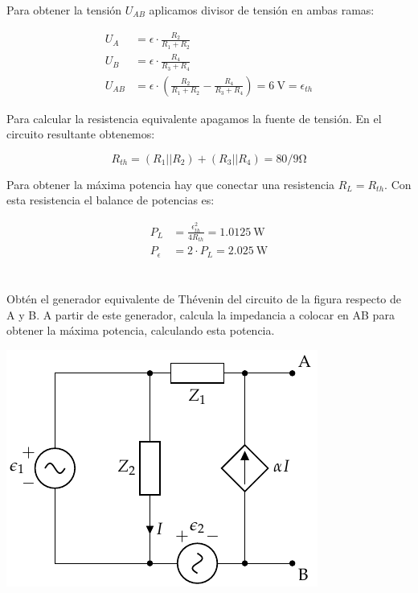\documentclass[12pt]{article}
\begin{document}
Para obtener la tensión $U_{AB}$ aplicamos divisor de tensión en ambas ramas:

\begin{align*}
  U_A &= \epsilon \cdot \frac{R_2}{R_1 + R_2}\\
  U_B &= \epsilon \cdot \frac{R_4}{R_3 + R_4}\\
  U_{AB} &= \epsilon \cdot (\frac{R_2}{R_1 + R_2} -  \frac{R_4}{R_3 + R_4}) = \SI{6}{\volt} = \epsilon_{th}
\end{align*}

Para calcular la resistencia equivalente apagamos la fuente de tensión. En el circuito resultante obtenemos:

\begin{equation*}
  R_{th} = (R_1 || R_2) + (R_3 || R_4) = 80/9\si{\ohm}
\end{equation*}

Para obtener la máxima potencia hay que conectar una resistencia $R_L = R_{th}$. Con esta resistencia el balance de potencias es:

\begin{align*}
  P_L &= \frac{\epsilon_{th}^2}{4R_{th}} = \SI{1.0125}{\watt}\\
    P_\epsilon &= 2 \cdot P_L = \SI{2.025}{\watt}
\end{align*}

\clearpage

\section{}

Obtén el generador equivalente de Thévenin del circuito de la figura respecto de A y B. A partir de este generador, calcula la impedancia a colocar en AB para obtener la máxima potencia, calculando esta potencia.

\begin{center}
\includegraphics{../figs/Thevenin5}
\end{center}
\end{document}
